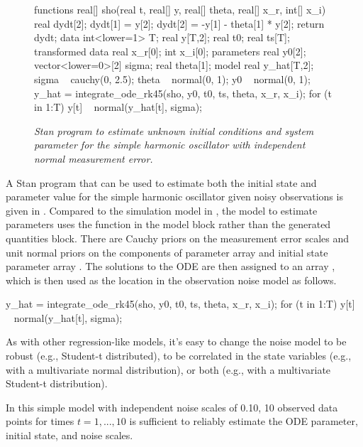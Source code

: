 %
\begin{figure}
\begin{stancode}
functions {
  real[] sho(real t,
             real[] y, 
             real[] theta,
             real[] x_r,
             int[] x_i) {
    real dydt[2];
    dydt[1] = y[2];
    dydt[2] = -y[1] - theta[1] * y[2];
    return dydt;
  }
}
data {
  int<lower=1> T;
  real y[T,2];
  real t0;
  real ts[T];
}
transformed data {
  real x_r[0];
  int x_i[0];
}
parameters {
  real y0[2];
  vector<lower=0>[2] sigma;
  real theta[1];
}
model {
  real y_hat[T,2];
  sigma ~ cauchy(0, 2.5);
  theta ~ normal(0, 1);
  y0 ~ normal(0, 1);
  y_hat = integrate_ode_rk45(sho, y0, t0, ts, theta, x_r, x_i);
  for (t in 1:T)
    y[t] ~ normal(y_hat[t], sigma);
}
\end{stancode}
\vspace*{-0.2in}
\caption{\small\it Stan program to estimate unknown initial conditions
   and system parameter  for the simple harmonic
  oscillator with independent normal measurement
  error.}\label{sho-both.figure}
\end{figure}
%
A Stan program that can be used to estimate both the initial state and
parameter value for the simple harmonic oscillator given noisy
observations is given in .  Compared to the
simulation model in , the model to estimate
parameters uses the  function in the model block
rather than the generated quantities block.  There are Cauchy priors on the
measurement error scales  and unit normal priors on the
components of parameter array  and initial state parameter
array .  The solutions to the ODE are then assigned to an
array , which is then used as the location in the
observation noise model as follows.
%
\begin{stancode}
y_hat = integrate_ode_rk45(sho, y0, t0, ts, theta, x_r, x_i);
for (t in 1:T)
  y[t] ~ normal(y_hat[t], sigma);
\end{stancode}
%
As with other regression-like models, it's easy to change the noise
model to be robust (e.g., Student-t distributed), to be correlated in
the state variables (e.g., with a multivariate normal distribution),
or both (e.g., with a multivariate Student-t distribution).

In this simple model with independent noise scales of 0.10, 10
observed data points for times $t = 1, ..., 10$ is sufficient to
reliably estimate the ODE parameter, initial state, and noise scales.


